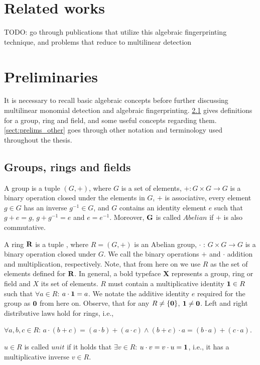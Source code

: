 \section{Related works} %
\label{sect:related_works}

TODO: go through publications that utilize this algebraic fingerprinting technique, 
and problems that reduce to multilinear detection

\section{Preliminaries}
\label{sect:prelims}

It is necessary to recall basic algebraic concepts 
before further discussing multilinear monomial detection and algebraic fingerprinting. 
\cref{sect:prelims_algebra} gives definitions for a group, ring and field, 
and some useful concepts regarding them. 
\cref{sect:prelims_other} goes through other notation and terminology used 
throughout the thesis.

\subsection{Groups, rings and fields} %
\label{sect:prelims_algebra}

A group 
is a tuple $(G, +)$, where $G$ is a set of elements,
$+ \colon G \times G \to G$
is a binary operation closed under 
the elements in $G$, $+$ is associative, every element $g\in G$ has an inverse $g^{-1}\in G$, and $G$ contains 
an identity element $e$ such that $g + e = g$, $g + g^{-1} = e$ and $e = e^{-1}$. Moreover, $\textbf G$ is called $Abelian$ if 
$+$ is also commutative.

A ring $\textbf R$ is a tuple
,
where $R = (G, +)$ is an Abelian group, $\cdot$ : $G \times G \longrightarrow G$ 
is a binary operation closed under $G$. We call the binary operations $+$ and
$\cdot$
addition and multiplication, respectively. 
Note, that from here on we use $R$ as the set of elements defined for $\textbf R$. 
In general, a bold typeface \textbf X represents a group, ring or field and $X$ its set of elements. 
$R$ must contain a multiplicative identity $\textbf 1 \in R$ such that $\forall a \in R$: $a \cdot \textbf 1 = a$. 
We notate the additive identity $e$ required for the group as $\textbf 0$ from here on. 
Observe, that for any $R \neq \{\textbf 0\}$, $\textbf 1 \neq \textbf 0$.  
Left and right distributive laws hold for rings, i.e., 
\begin{center}
  $\forall a, b, c \in R$: $a \cdot (b + c) = (a \cdot b) + (a \cdot c) \land (b + c) \cdot a = (b \cdot a) + (c \cdot a)$.
\end{center}
$u \in R$ is called $unit$ if it holds that $\exists v \in R$: $u \cdot v = v \cdot u = \textbf 1$, 
i.e., it has a multiplicative inverse $v \in R$.

